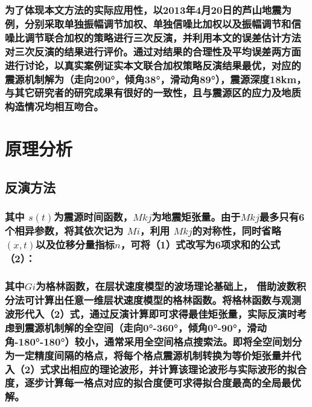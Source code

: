 \documentclass[a4paper,12pt,single,pdftex]{scrartcl}
\begin{document}
\label{ID_1381199343}\subsubsection{为了体现本文方法的实际应用性，以2013年4月20日的芦山地震为例，分别采取单独振幅调节加权、单独信噪比加权以及振幅调节和信噪比调节联合加权的策略进行三次反演，并利用本文的误差估计方法对三次反演的结果进行评价。通过对结果的合理性及平均误差两方面进行讨论，以真实案例证实本文联合加权策略反演结果最优，对应的震源机制解为（走向200°，倾角38°，滑动角89°），震源深度18km，与其它研究者的研究成果有很好的一致性，且与震源区的应力及地质构造情况均相互吻合。}

\label{ID_64212303}\section{原理分析}

\label{ID_424266573}\subsection{反演方法}

\label{ID_1903486780}\subsubsection{}

\label{ID_1164082214}\subsubsection{其中 $s(t)$为震源时间函数，$Mkj$为地震矩张量。由于$Mkj$最多只有6个相异参数，将其依次记为 $Mi$，利用 $Mkj$的对称性，同时省略 $(x,t)$以及位移分量指标$n$，可将（1）式改写为6项求和的公式（2）：}

\label{ID_1121124158}\subsubsection{ 其中$Gi$为格林函数，在层状速度模型的波场理论\citep{Haskell1964,Herrmann1979,Wang1980}基础上， 借助波数积分法\citep{Zhu2002}可计算出任意一维层状速度模型的格林函数。将格林函数与观测波形代入（2）式，通过反演计算即可求得最佳矩张量，实际反演时考虑到震源机制解的全空间（走向0°-360°，倾角0°-90°，滑动角-180°-180°）较小，通常采用全空间格点搜索法。即将全空间划分为一定精度间隔的格点，将每个格点震源机制转换为等价矩张量\citep{Jost1989}并代入（2）式求出相应的理论波形，并计算该理论波形与实际波形的拟合度，逐步计算每一格点对应的拟合度便可求得拟合度最高的全局最优解。}
\end{document}

